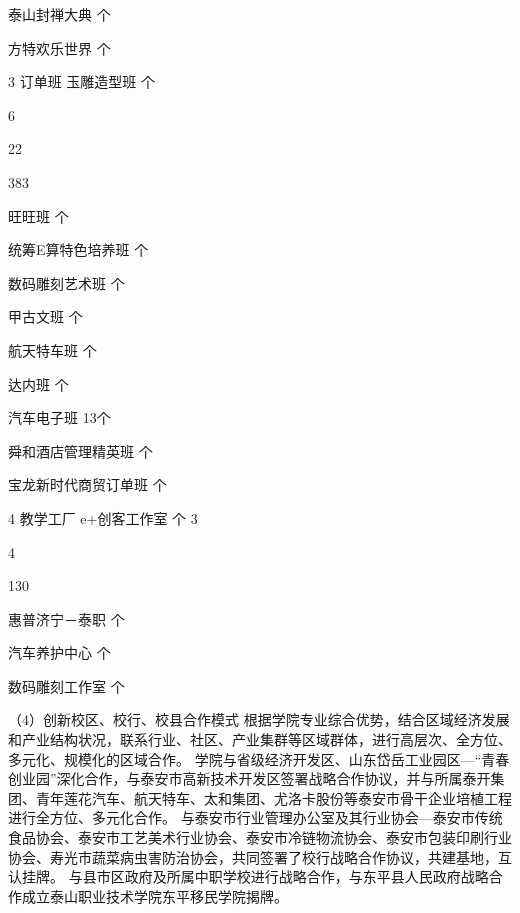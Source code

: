 泰山封禅大典
个





方特欢乐世界
个



3
订单班
玉雕造型班
个


6



22



383%



旺旺班
个





统筹E算特色培养班
个





数码雕刻艺术班
个





甲古文班
个





航天特车班
个





达内班
个





汽车电子班
13个





舜和酒店管理精英班
个





宝龙新时代商贸订单班
个



4
教学工厂
e+创客工作室
个
3

4

130%


惠普济宁－泰职
个





汽车养护中心
个





数码雕刻工作室
个



（4）创新校区、校行、校县合作模式
根据学院专业综合优势，结合区域经济发展和产业结构状况，联系行业、社区、产业集群等区域群体，进行高层次、全方位、多元化、规模化的区域合作。
学院与省级经济开发区、山东岱岳工业园区—“青春创业园”深化合作，与泰安市高新技术开发区签署战略合作协议，并与所属泰开集团、青年莲花汽车、航天特车、太和集团、尤洛卡股份等泰安市骨干企业培植工程进行全方位、多元化合作。
与泰安市行业管理办公室及其行业协会—泰安市传统食品协会、泰安市工艺美术行业协会、泰安市冷链物流协会、泰安市包装印刷行业协会、寿光市蔬菜病虫害防治协会，共同签署了校行战略合作协议，共建基地，互认挂牌。
与县市区政府及所属中职学校进行战略合作，与东平县人民政府战略合作成立泰山职业技术学院东平移民学院揭牌。







